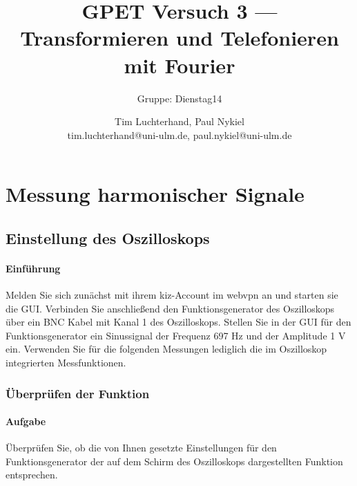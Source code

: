\documentclass[10pt]{scrreprt}
\author{Tim Luchterhand, Paul Nykiel \protect\\ tim.luchterhand@uni-ulm.de, paul.nykiel@uni-ulm.de}
\title{GPET Versuch 3 --- Transformieren und Telefonieren mit Fourier}
\subtitle{Gruppe: Dienstag14}
\begin{document}
        \maketitle

        \section{Messung harmonischer Signale}
        \subsection{Einstellung des Oszilloskops}
        \paragraph{Einführung}
        Melden Sie sich zunächst mit ihrem kiz-Account im webvpn an und starten sie die GUI.\@
        Verbinden Sie anschließend den Funktionsgenerator des Oszilloskops über ein BNC Kabel
        mit Kanal 1 des Oszilloskops. Stellen Sie in der GUI für den Funktionsgenerator ein Sinussignal der Frequenz 697 Hz und der Amplitude 1 V ein. Verwenden Sie für die folgenden
        Messungen lediglich die im Oszilloskop integrierten Messfunktionen.

        \subsubsection{Überprüfen der Funktion}
        \paragraph{Aufgabe}
        Überprüfen Sie, ob die von Ihnen gesetzte Einstellungen für den Funktionsgenerator
        der auf dem Schirm des Oszilloskops dargestellten Funktion entsprechen.
\end{document}
